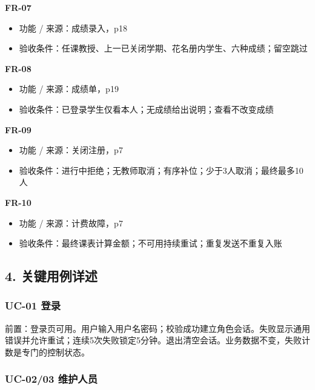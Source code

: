 \documentclass[UTF8,11pt,a4paper]{ctexart}
\providecommand{\tightlist}{\setlength{\itemsep}{0pt}\setlength{\parskip}{0pt}}
\begin{document}
\textbf{FR-07}

\begin{itemize}
\tightlist
\item
  功能 / 来源：成绩录入，p18
\item
  验收条件：任课教授、上一已关闭学期、花名册内学生、六种成绩；留空跳过
\end{itemize}

\textbf{FR-08}

\begin{itemize}
\tightlist
\item
  功能 / 来源：成绩单，p19
\item
  验收条件：已登录学生仅看本人；无成绩给出说明；查看不改变成绩
\end{itemize}

\textbf{FR-09}

\begin{itemize}
\tightlist
\item
  功能 / 来源：关闭注册，p7
\item
  验收条件：进行中拒绝；无教师取消；有序补位；少于3人取消；最终最多10人
\end{itemize}

\textbf{FR-10}

\begin{itemize}
\tightlist
\item
  功能 / 来源：计费故障，p7
\item
  验收条件：最终课表计算金额；不可用持续重试；重复发送不重复入账
\end{itemize}

\hypertarget{4-ux5173ux952eux7528ux4f8bux8be6ux8ff0}{%
\subsection{4.
关键用例详述}\label{4-ux5173ux952eux7528ux4f8bux8be6ux8ff0}}

\hypertarget{uc-01-ux767bux5f55}{%
\subsubsection{UC-01 登录}\label{uc-01-ux767bux5f55}}

前置：登录页可用。用户输入用户名密码；校验成功建立角色会话。失败显示通用错误并允许重试；连续5次失败锁定5分钟。退出清空会话。业务数据不变，失败计数是专门的控制状态。

\hypertarget{uc-0203-ux7ef4ux62a4ux4ebaux5458}{%
\subsubsection{UC-02/03
维护人员}\label{uc-0203-ux7ef4ux62a4ux4ebaux5458}}
\end{document}

